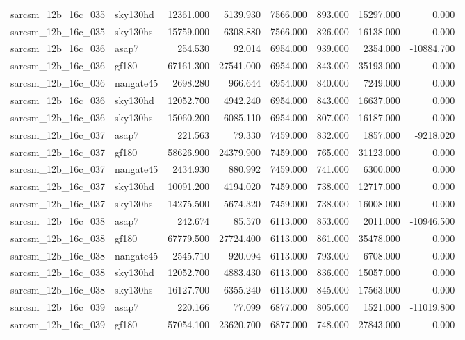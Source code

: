 \begin{tabular}{llrrrrrr}
sarcsm\_12b\_16c\_035 & sky130hd & 12361.000 & 5139.930 & 7566.000 & 893.000 & 15297.000 & 0.000 \\
sarcsm\_12b\_16c\_035 & sky130hs & 15759.000 & 6308.880 & 7566.000 & 826.000 & 16138.000 & 0.000 \\
sarcsm\_12b\_16c\_036 & asap7 & 254.530 & 92.014 & 6954.000 & 939.000 & 2354.000 & -10884.700 \\
sarcsm\_12b\_16c\_036 & gf180 & 67161.300 & 27541.000 & 6954.000 & 843.000 & 35193.000 & 0.000 \\
sarcsm\_12b\_16c\_036 & nangate45 & 2698.280 & 966.644 & 6954.000 & 840.000 & 7249.000 & 0.000 \\
sarcsm\_12b\_16c\_036 & sky130hd & 12052.700 & 4942.240 & 6954.000 & 843.000 & 16637.000 & 0.000 \\
sarcsm\_12b\_16c\_036 & sky130hs & 15060.200 & 6085.110 & 6954.000 & 807.000 & 16187.000 & 0.000 \\
sarcsm\_12b\_16c\_037 & asap7 & 221.563 & 79.330 & 7459.000 & 832.000 & 1857.000 & -9218.020 \\
sarcsm\_12b\_16c\_037 & gf180 & 58626.900 & 24379.900 & 7459.000 & 765.000 & 31123.000 & 0.000 \\
sarcsm\_12b\_16c\_037 & nangate45 & 2434.930 & 880.992 & 7459.000 & 741.000 & 6300.000 & 0.000 \\
sarcsm\_12b\_16c\_037 & sky130hd & 10091.200 & 4194.020 & 7459.000 & 738.000 & 12717.000 & 0.000 \\
sarcsm\_12b\_16c\_037 & sky130hs & 14275.500 & 5674.320 & 7459.000 & 738.000 & 16008.000 & 0.000 \\
sarcsm\_12b\_16c\_038 & asap7 & 242.674 & 85.570 & 6113.000 & 853.000 & 2011.000 & -10946.500 \\
sarcsm\_12b\_16c\_038 & gf180 & 67779.500 & 27724.400 & 6113.000 & 861.000 & 35478.000 & 0.000 \\
sarcsm\_12b\_16c\_038 & nangate45 & 2545.710 & 920.094 & 6113.000 & 793.000 & 6708.000 & 0.000 \\
sarcsm\_12b\_16c\_038 & sky130hd & 12052.700 & 4883.430 & 6113.000 & 836.000 & 15057.000 & 0.000 \\
sarcsm\_12b\_16c\_038 & sky130hs & 16127.700 & 6355.240 & 6113.000 & 845.000 & 17563.000 & 0.000 \\
sarcsm\_12b\_16c\_039 & asap7 & 220.166 & 77.099 & 6877.000 & 805.000 & 1521.000 & -11019.800 \\
sarcsm\_12b\_16c\_039 & gf180 & 57054.100 & 23620.700 & 6877.000 & 748.000 & 27843.000 & 0.000 \\

\end{tabular}
